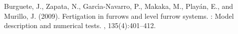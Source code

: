 \documentclass[a4paper,12pt]{report}
\begin{document}
\clearpage
\begin{thebibliography}{}

Burguete, J., Zapata, N., Garc\'{\i}a-Navarro, P., Ma\protect{\"{\i}}kaka, M.,
  Play\'an, E., and Murillo, J. (2009).
\newblock Fertigation in furrows and level furrow systems. : Model
  description and numerical tests.
,
  135(4):401--412.

\end{thebibliography}
\end{document}
